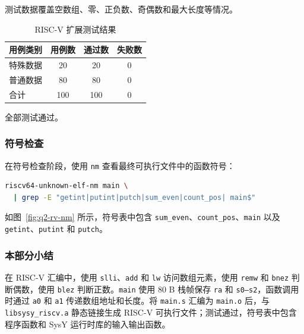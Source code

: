 测试数据覆盖空数组、零、正负数、奇偶数和最大长度等情况。

\begin{table}[H]
\centering

\begin{tabularx}{0.78\linewidth}{X c c c}
\toprule
用例类别 & 用例数 & 通过数 & 失败数 \\
\midrule
特殊数据 & 20 & 20 & 0 \\
普通数据 & 80 & 80 & 0 \\
\midrule
合计 & 100 & 100 & 0 \\
\bottomrule
\end{tabularx}
\caption{RISC-V 扩展测试结果}
\label{tab:q2-riscv-extended}
\end{table}

全部测试通过。

\subsubsection{符号检查}

在符号检查阶段，使用 \texttt{nm} 查看最终可执行文件中的函数符号：

\begin{lstlisting}[language=bash]
riscv64-unknown-elf-nm main \
  | grep -E "getint|putint|putch|sum_even|count_pos| main$"
\end{lstlisting}

如图~\ref{fig:q2-rv-nm} 所示，符号表中包含 \texttt{sum\_even}、\texttt{count\_pos}、\texttt{main} 以及 \texttt{getint}、\texttt{putint} 和 \texttt{putch}。


\subsubsection{本部分小结}

在 RISC-V 汇编中，使用 \texttt{slli}、\texttt{add} 和 \texttt{lw} 访问数组元素，使用 \texttt{remw} 和 \texttt{bnez} 判断偶数，使用 \texttt{blez} 判断正数。\texttt{main} 使用 80 B 栈帧保存 \texttt{ra} 和 \texttt{s0--s2}，函数调用时通过 \texttt{a0} 和 \texttt{a1} 传递数组地址和长度。将 \texttt{main.s} 汇编为 \texttt{main.o} 后，与 \texttt{libsysy\_riscv.a} 静态链接生成 RISC-V 可执行文件；测试通过，符号表中包含程序函数和 SysY 运行时库的输入输出函数。
